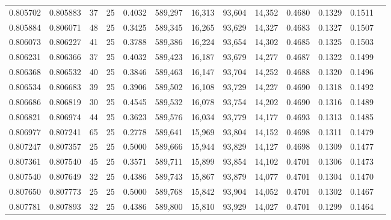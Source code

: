 \begin{tabular}{rrrrrrrrrrrrr}
0.805702 & 0.805883 &    37 &  25 &                                     0.4032 & 589,297 &  16,313 &  93,604 &  14,352 & 0.4680 & 0.1329 & 0.1511 \\
0.805884 & 0.806071 &    48 &  25 &                                     0.3425 & 589,345 &  16,265 &  93,629 &  14,327 & 0.4683 & 0.1327 & 0.1507 \\
0.806073 & 0.806227 &    41 &  25 &                                     0.3788 & 589,386 &  16,224 &  93,654 &  14,302 & 0.4685 & 0.1325 & 0.1503 \\
0.806231 & 0.806366 &    37 &  25 &                                     0.4032 & 589,423 &  16,187 &  93,679 &  14,277 & 0.4687 & 0.1322 & 0.1499 \\
0.806368 & 0.806532 &    40 &  25 &                                     0.3846 & 589,463 &  16,147 &  93,704 &  14,252 & 0.4688 & 0.1320 & 0.1496 \\
0.806534 & 0.806683 &    39 &  25 &                                     0.3906 & 589,502 &  16,108 &  93,729 &  14,227 & 0.4690 & 0.1318 & 0.1492 \\
0.806686 & 0.806819 &    30 &  25 &                                     0.4545 & 589,532 &  16,078 &  93,754 &  14,202 & 0.4690 & 0.1316 & 0.1489 \\
0.806821 & 0.806974 &    44 &  25 &                                     0.3623 & 589,576 &  16,034 &  93,779 &  14,177 & 0.4693 & 0.1313 & 0.1485 \\
0.806977 & 0.807241 &    65 &  25 &                                     0.2778 & 589,641 &  15,969 &  93,804 &  14,152 & 0.4698 & 0.1311 & 0.1479 \\
0.807247 & 0.807357 &    25 &  25 &                                     0.5000 & 589,666 &  15,944 &  93,829 &  14,127 & 0.4698 & 0.1309 & 0.1477 \\
0.807361 & 0.807540 &    45 &  25 &                                     0.3571 & 589,711 &  15,899 &  93,854 &  14,102 & 0.4701 & 0.1306 & 0.1473 \\
0.807540 & 0.807649 &    32 &  25 &                                     0.4386 & 589,743 &  15,867 &  93,879 &  14,077 & 0.4701 & 0.1304 & 0.1470 \\
0.807650 & 0.807773 &    25 &  25 &                                     0.5000 & 589,768 &  15,842 &  93,904 &  14,052 & 0.4701 & 0.1302 & 0.1467 \\
0.807781 & 0.807893 &    32 &  25 &                                     0.4386 & 589,800 &  15,810 &  93,929 &  14,027 & 0.4701 & 0.1299 & 0.1464 \\

\end{tabular}
